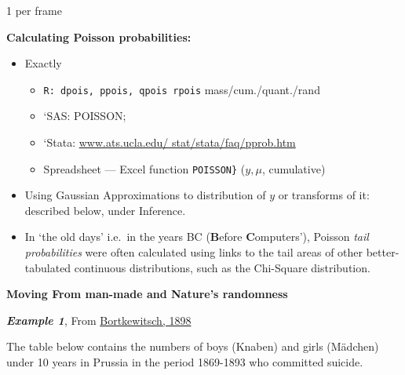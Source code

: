\documentclass[]{book}
\providecommand{\tightlist}{%
  \setlength{\itemsep}{0pt}\setlength{\parskip}{0pt}}
\begin{document}
1 per frame

\textbf{Calculating Poisson probabilities:}

\begin{itemize}
\item
  Exactly

  \begin{itemize}
  \tightlist
  \item
    \texttt{R:\ dpois,\ ppois,\ qpois\ rpois} mass/cum./quant./rand\\
  \item
    `SAS: POISSON;
  \item
    `Stata: \url{www.ats.ucla.edu/ stat/stata/faq/pprob.htm}\\
  \item
    Spreadsheet --- Excel function \texttt{POISSON\}} (\(y, \mu\), cumulative)
  \end{itemize}
\item
  Using Gaussian Approximations to distribution of \(y\) or transforms of it:
  described below, under Inference.
\item
  In `the old days' i.e.~in the years BC (\textbf{B}efore \textbf{C}omputers'), Poisson \emph{tail probabilities} were often calculated using links to the tail areas of other better-tabulated continuous distributions, such as the Chi-Square distribution.
\end{itemize}

\textbf{Moving From man-made and Nature's randomness}

\textbf{\emph{Example 1}}, From \href{http://www.biostat.mcgill.ca/hanley/statbook/dasGesetzDerKeinemZaklenBortkiewicz.pdf\#page=51}{Bortkewitsch, 1898}

The table below contains the numbers of boys (Knaben) and girls (Mädchen) under 10 years in Prussia in the period 1869-1893 who committed suicide.
\end{document}
